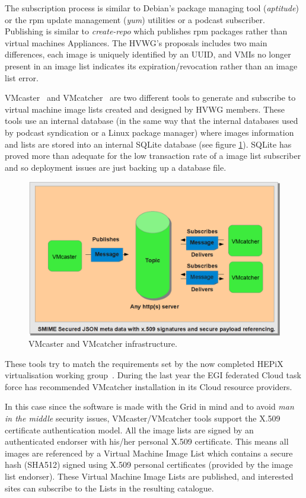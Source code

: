 \documentclass{cai}
\begin{document}
The subscription process is similar to Debian's package managing tool (\textit{aptitude}) or the rpm update management (\textit{yum}) utilities or a podcast subscriber. 
Publishing is similar to \textit{create-repo} which publishes rpm packages rather than virtual machines Appliances. 
The HVWG's proposals includes two main differences, each image is uniquely identified by an UUID, and VMIs no longer present in an image list indicates its expiration/revocation rather than an image list error.


VMcaster~\cite{vmcaster} and VMcatcher~\cite{vmcatcher} are two different tools to generate and subscribe to virtual machine image lists created and designed by HVWG members.
These tools use an internal database (in the same way that the internal databases used by podcast syndication or a Linux package manager) where images information and lists are stored into an internal SQLite database (see figure \ref{fig:infrastructure}).
SQLite has proved more than adequate for the low transaction rate of a image list subscriber and so deployment issues are just backing up a database file.

\begin{figure}
\centering
\includegraphics[width=1\textwidth]{vmcaster_vmcatcher.png}
\caption{VMcaster and VMcatcher infrastructure.}
\label{fig:infrastructure}
\end{figure}

These tools try to match the requirements set by the now completed HEPiX virtualisation working group~\cite{hepix}.
During the last year the EGI federated Cloud task force has recommended VMcatcher installation in its Cloud resource providers.

In this case since the software is made with the Grid in mind and to avoid {\it man in the middle} security issues, VMcaster/VMcatcher tools support the X.509 certificate authentication model.
All the image lists are signed by an authenticated endorser with his/her personal X.509 certificate. 
This means all images are referenced by a Virtual Machine Image List which contains a secure hash (SHA512) signed using X.509 personal certificates (provided by the image list endorser). 
These Virtual Machine Image Lists are published, and interested sites can subscribe to the Lists in the resulting catalogue. 
\end{document}
